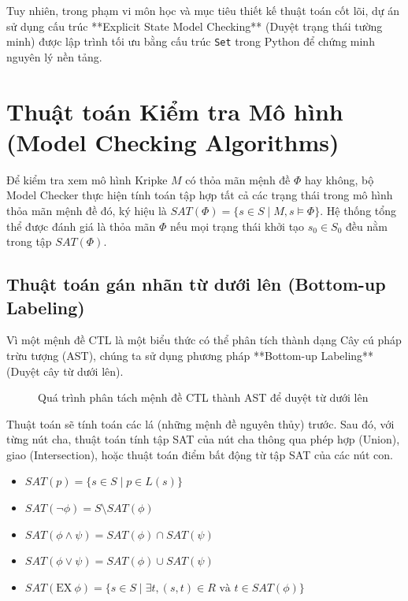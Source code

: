 \documentclass[12pt,a4paper]{article}
\begin{document}
Tuy nhiên, trong phạm vi môn học và mục tiêu thiết kế thuật toán cốt lõi, dự án sử dụng cấu trúc **Explicit State Model Checking** (Duyệt trạng thái tường minh) được lập trình tối ưu bằng cấu trúc \texttt{Set} trong Python để chứng minh nguyên lý nền tảng.

\newpage
\section{Thuật toán Kiểm tra Mô hình (Model Checking Algorithms)}

Để kiểm tra xem mô hình Kripke $M$ có thỏa mãn mệnh đề $\Phi$ hay không, bộ Model Checker thực hiện tính toán tập hợp tất cả các trạng thái trong mô hình thỏa mãn mệnh đề đó, ký hiệu là $SAT(\Phi) = \{ s \in S \mid M,s \models \Phi \}$.
Hệ thống tổng thể được đánh giá là thỏa mãn $\Phi$ nếu mọi trạng thái khởi tạo $s_0 \in S_0$ đều nằm trong tập $SAT(\Phi)$.

\subsection{Thuật toán gán nhãn từ dưới lên (Bottom-up Labeling)}
Vì một mệnh đề CTL là một biểu thức có thể phân tích thành dạng Cây cú pháp trừu tượng (AST), chúng ta sử dụng phương pháp **Bottom-up Labeling** (Duyệt cây từ dưới lên).

\begin{figure}[h!]
\centering
{}
\caption{Quá trình phân tách mệnh đề CTL thành AST để duyệt từ dưới lên}
\end{figure}

Thuật toán sẽ tính toán các lá (những mệnh đề nguyên thủy) trước. Sau đó, với từng nút cha, thuật toán tính tập SAT của nút cha thông qua phép hợp (Union), giao (Intersection), hoặc thuật toán điểm bất động từ tập SAT của các nút con.

\begin{itemize}
    \item $SAT(p) = \{ s \in S \mid p \in L(s) \}$
    \item $SAT(\neg \phi) = S \setminus SAT(\phi)$
    \item $SAT(\phi \land \psi) = SAT(\phi) \cap SAT(\psi)$
    \item $SAT(\phi \lor \psi) = SAT(\phi) \cup SAT(\psi)$
    \item $SAT(\text{EX} \ \phi) = \{ s \in S \mid \exists t, (s,t) \in R \text{ và } t \in SAT(\phi) \}$
\end{itemize}
\end{document}
